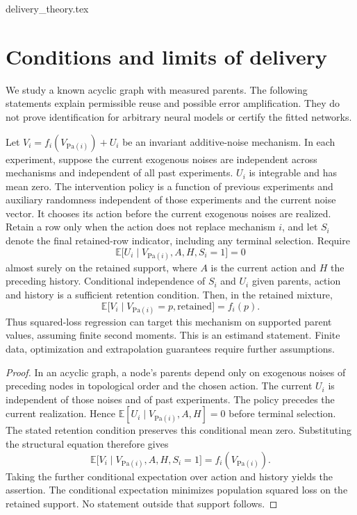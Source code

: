 \begin{filecontents*}[overwrite]{delivery_theory.tex}
\section{Conditions and limits of delivery}
\label{sec:theory}
We study a known acyclic graph with measured parents. The following statements
explain permissible reuse and possible error amplification. They do not prove
identification for arbitrary neural models or certify the fitted networks.

\begin{samepage}
\begin{proposition}
Let $V_i=f_i(V_{\mathrm{Pa}(i)})+U_i$ be an invariant additive-noise
mechanism. In each experiment, suppose the current exogenous noises are
independent across mechanisms and independent of all past experiments. $U_i$
is integrable and has mean zero. The intervention policy is a function of previous experiments and auxiliary
randomness independent of those experiments and the current noise vector.
It chooses its action before the current exogenous noises are realized. Retain a row only when the action does not replace mechanism $i$,
and let $S_i$ denote the final retained-row indicator, including any terminal
selection. Require
\[
 \mathbb E\bigl[U_i\mid V_{\mathrm{Pa}(i)},A,H,S_i=1\bigr]=0
\]
almost surely on the retained support, where $A$ is the current action and $H$ the preceding
history. Conditional independence of $S_i$ and $U_i$ given parents, action and
history is a sufficient retention condition. Then, in the retained mixture,
\[
 \mathbb E\bigl[V_i\mid V_{\mathrm{Pa}(i)}=p,\text{retained}\bigr]=f_i(p).
\]
Thus squared-loss regression can target this mechanism on supported parent
values, assuming finite second moments. This is an estimand statement. Finite
data, optimization and extrapolation guarantees require further assumptions.
\end{proposition}
\end{samepage}
\begin{proof}
In an acyclic graph, a node's parents depend only on exogenous noises of
preceding nodes in topological order and the chosen action. The current $U_i$
is independent of those noises and of past experiments. The policy precedes the current realization. Hence
$\mathbb E[U_i\mid V_{\mathrm{Pa}(i)},A,H]=0$ before terminal selection.
The stated retention condition preserves this conditional mean zero. Substituting the structural equation therefore gives
\[
 \mathbb E\bigl[V_i\mid V_{\mathrm{Pa}(i)},A,H,S_i=1\bigr]
 =f_i(V_{\mathrm{Pa}(i)}).
\]
Taking the further conditional expectation over
action and history yields the assertion.
The conditional expectation minimizes population squared loss on the retained
support. No statement outside that support follows.
\end{proof}


\end{filecontents*}
